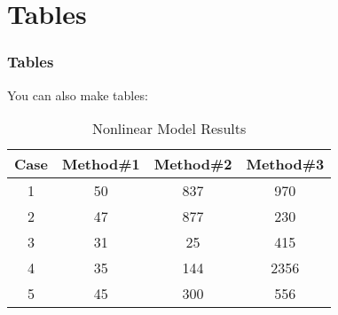 \documentclass{beamer}
\begin{document}
\section{Tables}

\begin{frame}
    \frametitle{Tables}
   You can also make tables:
\begin{table}[ht]
\caption{Nonlinear Model Results}
\centering
\begin{tabular}{c c c c}
\hline
\hline %
Case & Method\#1 & Method\#2 & Method\#3\\[0.5ex]
\hline
1 & 50& 837 & 970\\
2 & 47 & 877 & 230\\
3 & 31 & 25 & 415\\
4 & 35 & 144 & 2356\\
5 & 45 & 300 & 556\\[1ex]
\hline
\end{tabular}


\end{table}

\end{frame}









  
\end{document}
